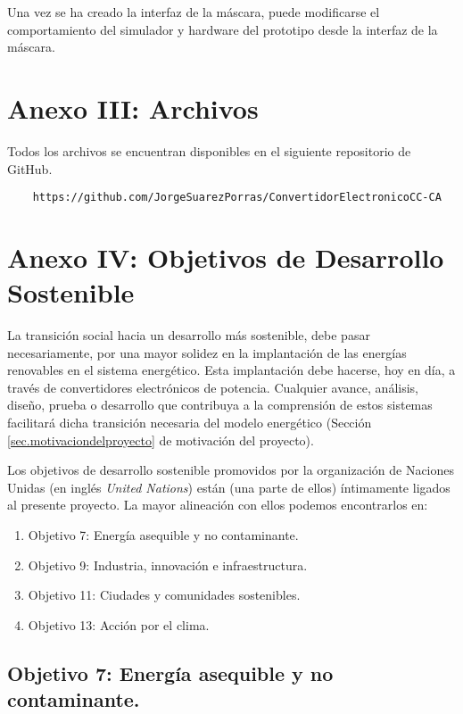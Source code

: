 \documentclass{report}
\begin{document}
Una vez se ha creado la interfaz de la máscara, puede modificarse el comportamiento del simulador y hardware del prototipo desde la interfaz de la máscara.

\clearpage
\newpage
\chapter{Anexo III: Archivos}

Todos los archivos se encuentran disponibles en el siguiente repositorio de GitHub.
\begin{verbatim}
    https://github.com/JorgeSuarezPorras/ConvertidorElectronicoCC-CA
\end{verbatim}

\chapter{Anexo IV: Objetivos de Desarrollo Sostenible} \label{sec.anexo3}

La transición social hacia un desarrollo más sostenible, debe pasar necesariamente, por una mayor solidez en la implantación de las energías renovables en el sistema energético. Esta implantación debe hacerse, hoy en día, a través de convertidores electrónicos de potencia. Cualquier avance, análisis, diseño, prueba o desarrollo  que contribuya a la comprensión de estos sistemas facilitará dicha transición necesaria del modelo energético (Sección \ref{sec.motivaciondelproyecto} de motivación del proyecto).

Los objetivos de desarrollo sostenible  promovidos por la organización de Naciones Unidas (en inglés \textit{United Nations}) están (una parte de ellos) íntimamente ligados al presente proyecto. La mayor alineación con ellos podemos encontrarlos en:
\begin{enumerate}
    \item Objetivo 7: Energía asequible y no contaminante.
    \item Objetivo 9: Industria, innovación e infraestructura.
    \item Objetivo 11: Ciudades y comunidades sostenibles.
    \item Objetivo 13: Acción por el clima.
\end{enumerate}

\section*{Objetivo 7: Energía asequible y no contaminante.}
\end{document}
